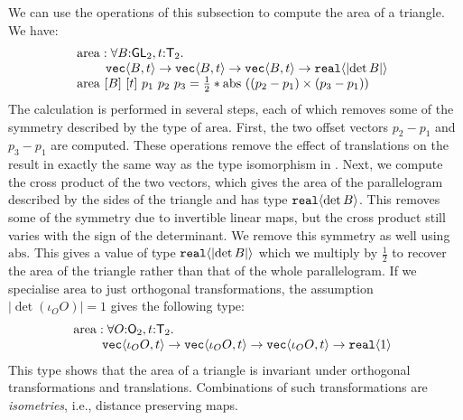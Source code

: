 \begin{example}\label{ex:area-of-triangle-1}
  We can use the operations of this subsection to
  compute the area of a triangle. We have:
  \begin{displaymath}
    \begin{array}{@{}l}
      \mathrm{area} : \forall B\mathord:\SynGL{2},
      t\mathord:\SynTransl{2}.\ \\
      \hspace{0.8cm}\tyPrim{vec}{B, t} \to \tyPrim{vec}{B, t} \to
      \tyPrim{vec}{B, t} \to \tyPrim{real}{\abs{\det B}}
      \\ \mathrm{area}\ [B]\ [t]\ p_1\ p_2\ p_3 = \frac{1}{2} *
      \mathrm{abs}\ ((p_2 - p_1) \times (p_3 - p_1))
    \end{array}
  \end{displaymath}
  The calculation is performed in several steps, each of which removes
  some of the symmetry described by the type of
  $\mathrm{area}$. First, the two offset vectors $p_2 - p_1$ and $p_3
  - p_1$ are computed. These operations remove the effect of
  translations on the result in exactly the same way as the type
  isomorphism in . Next, we compute the cross
  product of the two vectors, which gives the area of the
  parallelogram described by the sides of the triangle and has type
  $\textup{\texttt{real}}\langle \det B \rangle$. This removes some of the symmetry due to
  invertible linear maps, but the cross product still varies with the
  sign of the determinant. We remove this symmetry as well using
  $\mathrm{abs}$. This gives a value of type $\textup{\texttt{real}}\langle \lvert \det B \rvert \rangle$
  which we multiply by $\frac{1}{2}$ to recover the area of the
  triangle rather than that of the whole parallelogram. If we
  specialise $\mathrm{area}$ to just orthogonal transformations, the
  assumption $|\det (\iota_OO)| = 1$ gives the following type:
  \begin{displaymath}
    \begin{array}{@{}l}
      \mathrm{area} : \forall O\mathord:\SynOrth{2},
      t\mathord:\SynTransl{2}.\ \\
      \hspace{0.8cm}\tyPrim{vec}{\iota_OO, t} \to
      \tyPrim{vec}{\iota_OO, t} \to \tyPrim{vec}{\iota_OO, t} \to
      \tyPrim{real}{1}
    \end{array}
  \end{displaymath}
  This type shows that the area of a triangle is invariant under
  orthogonal transformations and translations. Combinations of such
  transformations are {\em isometries}, i.e., distance preserving
  maps.
\end{example}

